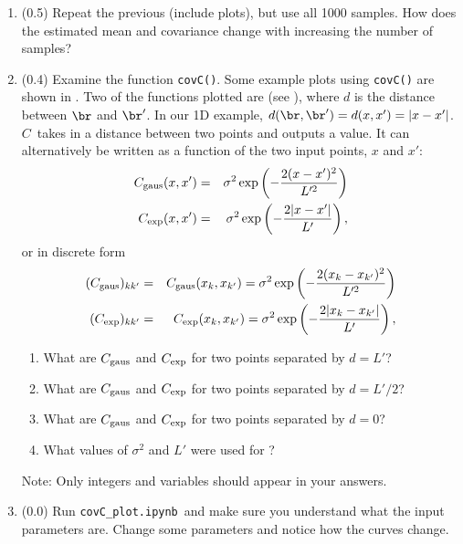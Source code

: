 \documentclass[11pt,titlepage,fleqn]{article}
\newcommand{\cfile}{{\tt covC\_plot.ipynb}}
\begin{document}
\begin{enumerate}
\item (0.5) Repeat the previous (include plots), but use all 1000 samples. How does the estimated mean and covariance change with increasing the number of samples?

\label{prob:Cd}


\item (0.4) Examine the function \verb+covC()+.
Some example plots using \verb+covC()+ are shown in . Two of the functions plotted are  (see ), where $d$ is the distance between $\br$ and $\br'$. In our 1D example, $d(\br,\br') = d(x,x') = |x - x'|$.
%
$C$~takes in a distance between two points and outputs a value. It can alternatively be written as a function of the two input points, $x$ and $x'$:
%
\begin{eqnarray}
C_{\rm gaus}(x,x') &=&
\sigma^2 \exp \left( - \frac{2 (x-x')^2}{L'^2} \right) 
\\
C_{\rm exp}(x,x') &=&
\sigma^2 \exp \left( - \frac{2 |x-x'|}{L'} \right)
,
\end{eqnarray}
%
or in discrete form
%
\begin{eqnarray}
(C_{\rm gaus})_{kk'} &=& C_{\rm gaus}(x_k,x_{k'}) =
\sigma^2 \exp \left( - \frac{2 (x_k-x_{k'})^2}{L'^2} \right) 
\\
(C_{\rm exp})_{kk'} &=& C_{\rm exp}(x_k,x_{k'}) =
\sigma^2 \exp \left( - \frac{2 |x_k-x_{k'}|}{L'} \right)
,
\end{eqnarray}

\begin{enumerate}
\item What are $C_{\rm gaus}$ and $C_{\rm exp}$ for two points separated by $d = L'$?
\item What are $C_{\rm gaus}$ and $C_{\rm exp}$ for two points separated by $d = L'/2$?
\item What are $C_{\rm gaus}$ and $C_{\rm exp}$ for two points separated by $d = 0$?
\item What values of $\sigma^2$ and $L'$ were used for ?
\end{enumerate}
%
Note: Only integers and variables should appear in your answers.


\item (0.0) Run \cfile\ and make sure you understand what the input parameters are. Change some parameters and notice how the curves change.


\end{enumerate}
\end{document}
